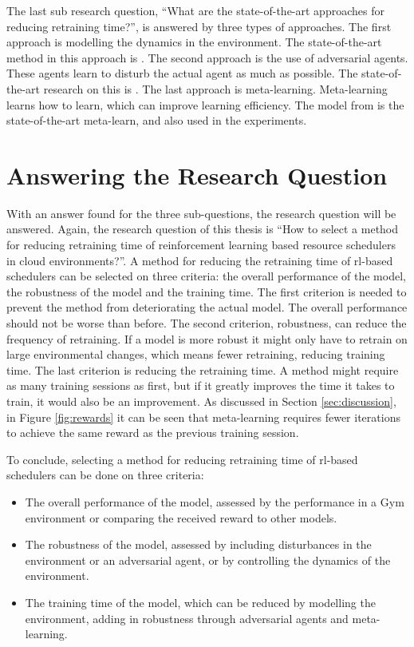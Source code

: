 The last sub research question, ``What are the state-of-the-art approaches for
reducing retraining time?'', is answered by three types of approaches. The
first approach is modelling the dynamics in the environment. The
state-of-the-art method in this approach is . The second
approach is the use of adversarial agents. These agents learn to disturb the
actual agent as much as possible. The state-of-the-art research on this is
. The last approach is meta-learning. Meta-learning learns how
to learn, which can improve learning efficiency. The \mrlco model from
 is the state-of-the-art meta-learn, and also used in the
experiments.


\section{Answering the Research Question}

With an answer found for the three sub-questions, the research question will
be answered. Again, the research question of this thesis is ``How to select a
method for reducing retraining time of reinforcement learning based resource
schedulers in cloud environments?''. A method for reducing the retraining time
of \gls{rl}-based schedulers can be selected on three criteria: the overall
performance of the model, the robustness of the model and the training time.
The first criterion is needed to prevent the method from deteriorating the
actual model. The overall performance should not be worse than before. The
second criterion, robustness, can reduce the frequency of retraining. If a
model is more robust it might only have to retrain on large environmental
changes, which means fewer retraining, reducing training time. The last
criterion is reducing the retraining time. A method might require as many
training sessions as first, but if it greatly improves the time it takes to
train, it would also be an improvement. As discussed in Section
\ref{sec:discussion}, in Figure \ref{fig:rewards} it can be seen that
meta-learning requires fewer iterations to achieve the same reward as the
previous training session.

To conclude, selecting a method for reducing retraining time of \gls{rl}-based
schedulers can be done on three criteria:
\begin{itemize}[noitemsep]
    \item The overall performance of the model, assessed by the performance
        in a Gym environment or comparing the received reward to other models.
    \item The robustness of the model, assessed by including disturbances in
        the environment or an adversarial agent, or by controlling the
        dynamics of the environment.
    \item The training time of the model, which can be reduced by modelling
        the environment, adding in robustness through adversarial agents and
        meta-learning.
\end{itemize}



